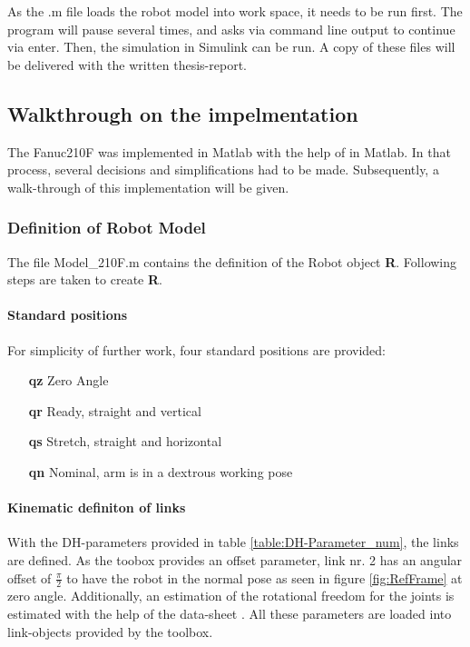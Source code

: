 As the .m file loads the robot model into work space, it needs to be run first. The program will pause several times, and asks via command line output to continue via enter.  Then, the simulation in Simulink can be run.
A copy of these files will be delivered with the written thesis-report.

\subsection{Walkthrough on the impelmentation}
The Fanuc210F was implemented in Matlab with the help of \cite{CorkeRoboticVisionControl} in Matlab. In that process, several decisions and simplifications had to be made. Subsequently, a walk-through of this implementation will be given.

\subsubsection{Definition of Robot Model}
The file Model_210F.m contains the definition of the Robot object \textbf{R}. Following steps are taken to create \textbf{R}.

\paragraph{Standard positions}
For simplicity of further work, four standard positions are provided:\\
\begin{itemize}
	\item[\textbf{qz}] Zero Angle
	\item[\textbf{qr}] Ready, straight and vertical
	\item[\textbf{qs}] Stretch, straight and horizontal
	\item[\textbf{qn}] Nominal, arm is in a dextrous working pose
\end{itemize}

\paragraph{Kinematic definiton of links}
With the DH-parameters provided in table \ref{table:DH-Parameter_num}, the links are defined. 
As the toobox provides an offset parameter, link nr. 2 has an angular offset of $\frac{\pi}{2}$ to have the robot in the normal pose as seen in figure \ref{fig:RefFrame} at zero angle.
Additionally, an estimation of the rotational freedom for the joints is estimated with the help of the data-sheet \cite{210FDatasheet}. All these parameters are loaded into link-objects provided by the toolbox.

